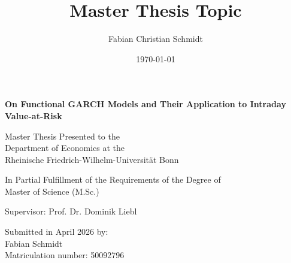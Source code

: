 \documentclass[12pt,a4paper]{article}
\title{Master Thesis Topic}
\author{Fabian Christian Schmidt}
\date{\today}
\theoremstyle{definition}
\begin{document}
\begin{titlepage}
    \begin{center}
        \vspace*{0.5cm}
            
        \huge
        \textbf{On Functional GARCH Models and Their Application to Intraday Value-at-Risk}
            
        \vspace{2cm}
        \large
        Master Thesis Presented to the\\
        Department of Economics at the\\
        Rheinische Friedrich-Wilhelm-Universität Bonn
            
        \vspace{1cm}
            
        In Partial Fulfillment of the Requirements of the Degree of\\
        Master of Science (M.Sc.)
            
        \vspace{4.5cm}
            
        \large
        Supervisor: Prof. Dr. Dominik Liebl

        \vspace{1.5cm}
        Submitted in April 2026 by:\\
        Fabian Schmidt\\
        Matriculation number: 50092796
            
    \end{center}
\end{titlepage}
\pagestyle{empty}
\tableofcontents
\clearpage
\pagestyle{plain}
\setcounter{page}{1}
\end{document}
